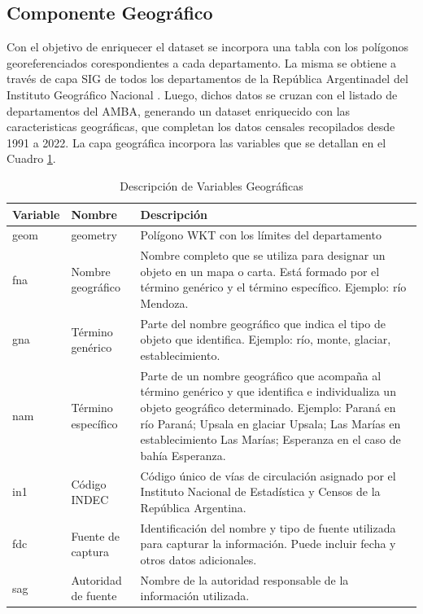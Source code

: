 \documentclass{article}
\theoremstyle{mytheoremstyle}
\theoremstyle{mytheoremstyle}
\theoremstyle{myproblemstyle}
\begin{document}
\subsection{Componente Geográfico }
Con el objetivo de enriquecer el dataset se incorpora una tabla con los polígonos georeferenciados corespondientes a cada departamento.
 La misma se obtiene a través de capa SIG de todos los departamentos de la República Argentinadel del Instituto Geográfico Nacional  . 
Luego, dichos datos se cruzan con el listado de departamentos del AMBA, generando un dataset enriquecido con las caracteristicas geográficas, que completan 
los datos censales recopilados desde 1991 a 2022. La capa geográfica incorpora las variables que se detallan en el Cuadro \ref{tab:geo.depto}.
\begin{table}[htbp]
    \centering
      \begin{tabular}{|l|l|p{8cm}|}
        \hline
        \textbf{Variable} & \textbf{Nombre} & \textbf{Descripción} \\
        \hline
        geom & geometry & Polígono WKT con los límites del departamento \\
        fna & Nombre geográfico & Nombre completo que se utiliza para designar un objeto en un mapa o carta. Está formado por el término genérico y el término específico. Ejemplo: río Mendoza. \\
        gna & Término genérico & Parte del nombre geográfico que indica el tipo de objeto que identifica. Ejemplo: río, monte, glaciar, establecimiento. \\
        nam & Término específico & Parte de un nombre geográfico que acompaña al término genérico y que identifica e individualiza un objeto geográfico determinado. Ejemplo: Paraná en río Paraná; Upsala en glaciar Upsala; Las Marías en establecimiento Las Marías; Esperanza en el caso de bahía Esperanza. \\
        in1 & Código INDEC & Código único de vías de circulación asignado por el Instituto Nacional de Estadística y Censos de la República Argentina. \\
        fdc & Fuente de captura & Identificación del nombre y tipo de fuente utilizada para capturar la información. Puede incluir fecha y otros datos adicionales. \\
        sag & Autoridad de fuente & Nombre de la autoridad responsable de la información utilizada. \\
        \hline
    \end{tabular}
  \caption{Descripción de Variables Geográficas}
    \label{tab:geo.depto}
\end{table}
\end{document}
